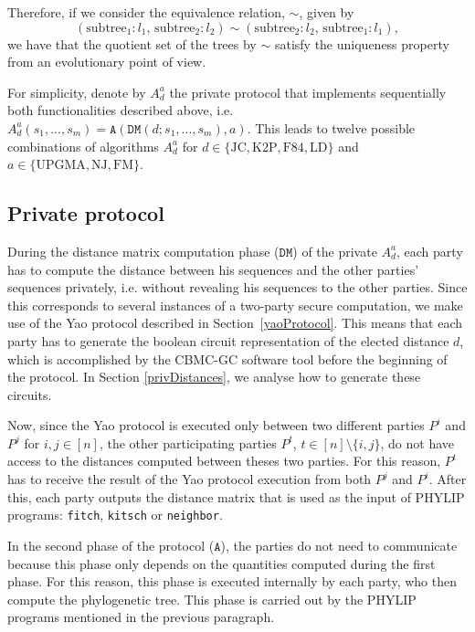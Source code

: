 \begin{itemize}
    Therefore, if we consider the equivalence relation, $\sim$, given by
    \begin{equation*}
    (\text{subtree}_1:l_1,\, \text{subtree}_2:l_2)  \sim (\text{subtree}_2:l_2,\, \text{subtree}_1:l_1),
    \end{equation*}
	we have that the quotient set of the trees by $\sim$ satisfy the uniqueness property from an evolutionary point of view.

   
\end{itemize}

For simplicity, denote by $A_d^a$ the private protocol that implements sequentially both functionalities described above, i.e. $A_d^a(s_1, ... , s_m) = \mathtt{A}( \mathtt{DM}(d; s_1, ..., s_m), a)$. This leads to twelve possible combinations of algorithms $A_d^a$ for $d\in\{\text{JC}, \text{K2P}, \text{F84}, \text{LD}\}$ and $a \in \{\text{UPGMA}, \text{NJ}, \text{FM}\}$.

\subsection{Private protocol}

During the distance matrix computation phase ($\mathtt{DM}$) of the private $A_d^a$, each party has to compute the distance between his sequences and the other parties' sequences privately, i.e. without revealing his sequences to the other parties. Since this corresponds to several instances of a two-party secure computation, we make use of the Yao protocol described in Section~\ref{yaoProtocol}. This means that each party has to generate the boolean circuit representation of the elected distance $d$, which is accomplished by the CBMC-GC software tool before the beginning of the protocol. In Section \ref{privDistances}, we analyse how to generate these circuits.

Now, since the Yao protocol is executed only between two different parties $P^i$ and $P^j$ for $i, j \in[n]$, the other participating parties $P^t$, $t\in[n]\setminus \{i,j\}$, do not have access to the distances computed between theses two parties. For this reason, $P^t$ has to receive the result of the Yao protocol execution from both $P^j$ and $P^i$. After this, each party outputs the distance matrix that is used as the input of PHYLIP programs: \texttt{fitch}, \texttt{kitsch} or \texttt{neighbor}. 

In the second phase of the protocol ($\mathtt{A}$), the parties do not need to communicate because this phase only depends on the quantities computed during the first phase. For this reason, this phase is executed internally by each party, who then compute the phylogenetic tree. This phase is carried out by the PHYLIP programs mentioned in the previous paragraph.

